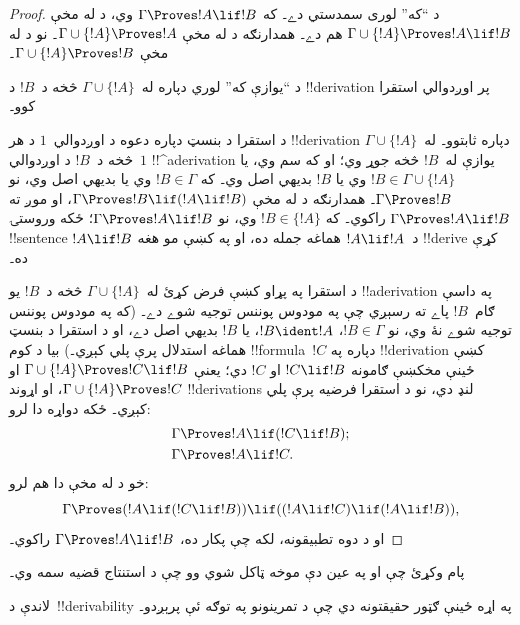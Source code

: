 \documentclass[../../../include/open-logic-section]{subfiles}
\begin{document}
\begin{proof}
د ``که'' لوری سمدستي دے۔ که $\Gamma \Proves !A \lif !B$ وي، د
 له مخې
$\Gamma \cup \{!A\} \Proves !A \lif !B$ هم دے۔ همدارنګه د
 له مخې
$\Gamma \cup \{!A\} \Proves !A$۔ نو د  له مخې
$\Gamma \cup \{!A\} \Proves !B$۔

د ``يوازې که'' لوري دپاره له~$\Gamma \cup \{!A\}$ څخه د~$!B$ د
!!{derivation} پر اوږدوالي استقرا کوو۔

د استقرا د بنسټ دپاره دعوه د اوږدوالي~$1$ د هر !!{derivation}
دپاره ثابتوو۔ له~$\Gamma \cup \{!A\}$ څخه د~$!B$ د اوږدوالي~$1$
!!^a{derivation} يوازې له~$!B$ څخه جوړ وي؛ او که سم وي، يا
$!B \in \Gamma \cup \{!A\}$ وي يا $!B$ بديهي اصل وي۔
که $!B \in \Gamma$ وي يا بديهي اصل وي، نو $\Gamma \Proves !B$۔
همدارنګه د  له مخې
$\Gamma \Proves !B \lif (!A \lif !B)$، او  موږ ته
$\Gamma \Proves !A \lif !B$ راکوي۔ که $!B \in \{ !A\}$ وي، نو
$\Gamma \Proves !A \lif !B$؛ ځکه وروستۍ !!{sentence}
$!A \lif !B$ د~$!A \lif !A$ هماغه جمله ده، او په
 کښې مو هغه !!{derive} کړې ده۔

د استقرا په پړاو کښې فرض کړئ له~$\Gamma \cup \{!A\}$ څخه د~$!B$
يو !!a{derivation} په داسې ګام~$!B$ پاے ته رسېږي چې په مودوس پوننس
توجيه شوے دے۔ (که په مودوس پوننس توجيه شوے نۀ وي، نو
$!B \in \Gamma$، $!B \ident !A$، يا $!B$ بديهي اصل دے، او د استقرا
د بنسټ هماغه استدلال پرې پلي کېږي۔) بيا د کوم !!{formula}~$!C$
دپاره په !!{derivation} کښې ځينې مخکښې ګامونه $!C \lif !B$ او
$!C$ دي؛ يعنې $\Gamma \cup \{!A\} \Proves !C \lif !B$ او
$\Gamma \cup \{!A\} \Proves !C$، او اړوند !!{derivation}s لنډ دي،
نو د استقرا فرضيه پرې پلي کېږي۔ ځکه دواړه دا لرو:
\begin{align*}
  & \Gamma \Proves !A \lif (!C \lif !B); \\
  & \Gamma \Proves !A \lif !C.
\end{align*}
خو د  له مخې دا هم لرو:
\[
\Gamma \Proves (!A \lif (!C \lif !B)) \lif
((!A\lif !C)  \lif (!A \lif !B)),
\]
او د  دوه تطبيقونه، لکه چې پکار ده،
$\Gamma \Proves !A \lif !B$ راکوي۔
\end{proof}

پام وکړئ چې  او  په عين
دې موخه ټاکل شوي وو چې د استنتاج قضيه سمه وي۔

لاندې د~!!{derivability} په اړه ځينې ګټور حقيقتونه دي چې د تمرينونو
په توګه ئې پرېږدو۔
\end{document}
